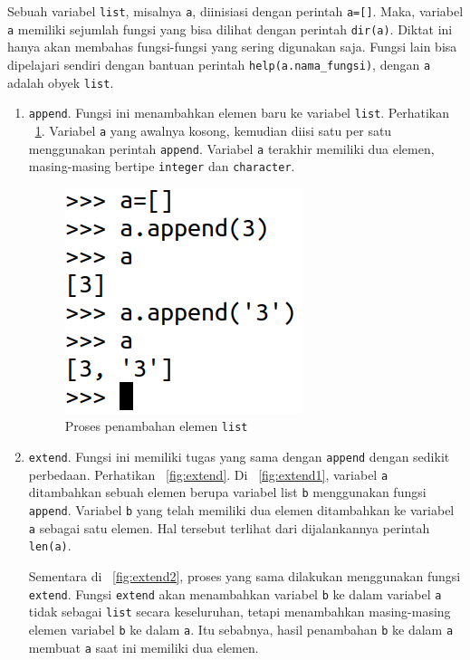 Sebuah variabel \texttt{list}, misalnya \texttt{a}, diinisiasi dengan perintah \texttt{a=[]}. Maka, variabel \texttt{a} memiliki sejumlah fungsi yang bisa dilihat dengan perintah \texttt{dir(a)}. Diktat ini hanya akan membahas fungsi-fungsi yang sering digunakan saja. Fungsi lain bisa dipelajari sendiri dengan bantuan perintah \texttt{help(a.nama\_fungsi)}, dengan \texttt{a} adalah obyek \texttt{list}.

\begin{enumerate}
  \item \texttt{append}. Fungsi ini menambahkan elemen baru ke variabel \texttt{list}. Perhatikan \figurename~\ref{fig:append}. Variabel \texttt{a} yang awalnya kosong, kemudian diisi satu per satu menggunakan perintah \texttt{append}. Variabel \texttt{a} terakhir memiliki dua elemen, masing-masing bertipe \texttt{integer} dan \texttt{character}.
  \begin{figure}
    \begin{center}
      \includegraphics[scale=1.25]{pics/append.png}
      \caption{Proses penambahan elemen \texttt{list}}
      \label{fig:append}
    \end{center}
  \end{figure}
  
  \item \texttt{extend}. Fungsi ini memiliki tugas yang sama dengan \texttt{append} dengan sedikit perbedaan. Perhatikan \figurename~\ref{fig:extend}. Di \figurename~\ref{fig:extend1}, variabel \texttt{a} ditambahkan sebuah elemen berupa variabel list \texttt{b} menggunakan fungsi \texttt{append}. Variabel \texttt{b} yang telah memiliki dua elemen ditambahkan ke variabel \texttt{a} sebagai satu elemen. Hal tersebut terlihat dari dijalankannya perintah \texttt{len(a)}.
  
Sementara di \figurename~\ref{fig:extend2}, proses yang sama dilakukan menggunakan fungsi \texttt{extend}. Fungsi \texttt{extend} akan menambahkan variabel \texttt{b} ke dalam variabel \texttt{a} tidak sebagai \texttt{list} secara keseluruhan, tetapi menambahkan masing-masing elemen variabel \texttt{b} ke dalam \texttt{a}. Itu sebabnya, hasil penambahan \texttt{b} ke dalam \texttt{a} membuat \texttt{a} saat ini memiliki dua elemen.
  

\end{enumerate}
